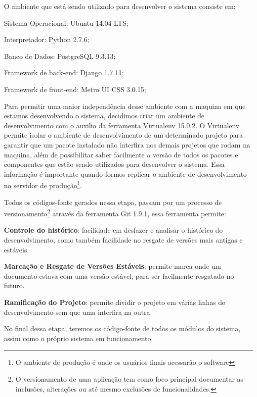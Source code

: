 O ambiente que est\'a sendo utilizado para desenvolver o sistema consiste em:
\begin{alineas}
	\item Sistema Operacional: Ubuntu 14.04 LTS;
	\item Interpretador: Python 2.7.6;
	\item Banco de Dados: PostgreSQL 9.3.13;
	\item Framework de back-end: Django 1.7.11;
	\item Framework de front-end: Metro UI CSS 3.0.15;
\end{alineas}

Para permitir uma maior independ\^encia desse ambiente com a maquina em que estamos desenvolvendo o sistema, decidimos criar um ambiente de desenvolvimento com o auxilio da 
ferramenta Virtualenv 15.0.2. O Virtualenv permite isolar o ambiente de desenvolvimento de um determinado projeto para garantir que um pacote instalado não interfira nos demais projetos que 
rodam na maquina, al\'em de possibilitar saber facilmente a vers\~ao de todos os pacotes e componentes que est\~ao sendo utilizados para desenvolver o sistema. Essa informa\c{c}\~ao \'e 
importante quando formos replicar o ambiente de desenvolvimento no servidor de produ\c{c}\~ao\footnote{O ambiente de produção é onde os usuários finais acessarão o software}. 

Todos os c\'odigos-fonte gerados nessa etapa, passam por um processo de versionamento\footnote{O versionamento de uma aplicação tem como foco principal documentar as inclusões, alterações ou até 
mesmo exclusões de funcionalidades.} atrav\'es da ferramenta Git 1.9.1, essa ferramenta permite:

\begin{alineascomponto}
	\item \textbf{Controle do histórico}: facilidade em desfazer e analisar o histórico do desenvolvimento, como também facilidade no resgate de versões mais antigas e estáveis.
	\item \textbf{Marca\c{c}\~ao e Resgate de Vers\~oes Est\'aveis}: permite marca onde um documento estava com uma vers\~ao est\'avel, para ser facilmente resgatado no futuro.
	\item \textbf{Ramifica\c{c}\~ao do Projeto}: permite dividir o projeto em v\'arias linhas de desenvolvimento sem que uma interfira na outra. 
\end{alineascomponto}

No final dessa etapa, teremos os código-fonte de todos os módulos do sistema, assim como o próprio sistema em funcionamento. 

